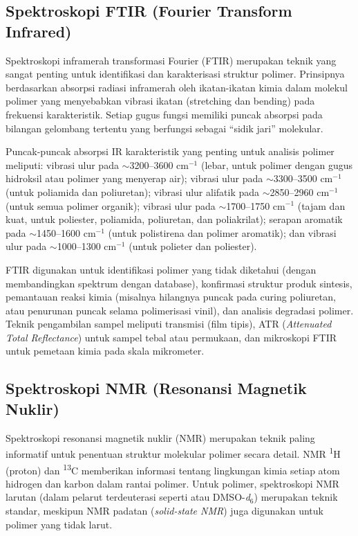 \documentclass[12pt,a4paper,openany]{book}
\begin{document}
\subsection{Spektroskopi FTIR (Fourier Transform Infrared)}

Spektroskopi inframerah transformasi Fourier (FTIR) merupakan teknik yang sangat penting untuk identifikasi dan karakterisasi struktur polimer. Prinsipnya berdasarkan absorpsi radiasi inframerah oleh ikatan-ikatan kimia dalam molekul polimer yang menyebabkan vibrasi ikatan (stretching dan bending) pada frekuensi karakteristik. Setiap gugus fungsi memiliki puncak absorpsi pada bilangan gelombang tertentu yang berfungsi sebagai ``sidik jari'' molekular.

Puncak-puncak absorpsi IR karakteristik yang penting untuk analisis polimer meliputi: vibrasi ulur  pada $\sim$3200--3600 cm$^{-1}$ (lebar, untuk polimer dengan gugus hidroksil atau polimer yang menyerap air); vibrasi ulur  pada $\sim$3300--3500 cm$^{-1}$ (untuk poliamida dan poliuretan); vibrasi ulur  alifatik pada $\sim$2850--2960 cm$^{-1}$ (untuk semua polimer organik); vibrasi ulur  pada $\sim$1700--1750 cm$^{-1}$ (tajam dan kuat, untuk poliester, poliamida, poliuretan, dan poliakrilat); serapan  aromatik pada $\sim$1450--1600 cm$^{-1}$ (untuk polistirena dan polimer aromatik); dan vibrasi ulur  pada $\sim$1000--1300 cm$^{-1}$ (untuk polieter dan poliester).

FTIR digunakan untuk identifikasi polimer yang tidak diketahui (dengan membandingkan spektrum dengan database), konfirmasi struktur produk sintesis, pemantauan reaksi kimia (misalnya hilangnya puncak  pada curing poliuretan, atau penurunan puncak  selama polimerisasi vinil), dan analisis degradasi polimer. Teknik pengambilan sampel meliputi transmisi (film tipis), ATR (\textit{Attenuated Total Reflectance}) untuk sampel tebal atau permukaan, dan mikroskopi FTIR untuk pemetaan kimia pada skala mikrometer.

\subsection{Spektroskopi NMR (Resonansi Magnetik Nuklir)}

Spektroskopi resonansi magnetik nuklir (NMR) merupakan teknik paling informatif untuk penentuan struktur molekular polimer secara detail. NMR \textsuperscript{1}H (proton) dan \textsuperscript{13}C memberikan informasi tentang lingkungan kimia setiap atom hidrogen dan karbon dalam rantai polimer. Untuk polimer, spektroskopi NMR larutan (dalam pelarut terdeuterasi seperti  atau DMSO-\textit{d}$_6$) merupakan teknik standar, meskipun NMR padatan (\textit{solid-state NMR}) juga digunakan untuk polimer yang tidak larut.
\end{document}
